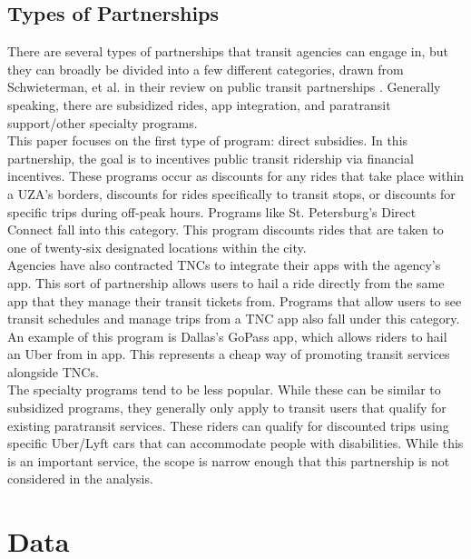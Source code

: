 \documentclass [12pt]{report}
\begin{document}
\subsection*{Types of Partnerships}
There are several types of partnerships that transit agencies can engage in, but they can broadly be divided into a few different categories, drawn from Schwieterman, et al. in their review on public transit partnerships \parencite{depaul}. Generally speaking, there are subsidized rides, app integration, and paratransit support/other specialty programs. \\
\indent This paper focuses on the first type of program: direct subsidies. In this partnership, the goal is to incentives public transit ridership via financial incentives. These programs occur as discounts for any rides that take place within a UZA's borders, discounts for rides specifically to transit stops, or discounts for specific trips during off-peak hours. Programs like St. Petersburg's Direct Connect fall into this category. This program discounts rides that are taken to one of twenty-six designated locations within the city.\\
\indent Agencies have also contracted TNCs to integrate their apps with the agency's app. This sort of partnership allows users to hail a ride directly from the same app that they manage their transit tickets from. Programs that allow users to see transit schedules and manage trips from a TNC app also fall under this category. An example of this program is Dallas's GoPass app, which allows riders to hail an Uber from in app. This represents a cheap way of promoting transit services alongside TNCs.\\
\indent The specialty programs tend to be less popular. While these can be similar to subsidized programs, they generally only apply to transit users that qualify for existing paratransit services. These riders can qualify for discounted trips using specific Uber/Lyft cars that can accommodate people with disabilities. While this is an important service, the scope is narrow enough that this partnership is not considered in the analysis.

\section*{Data}

\end{document}
